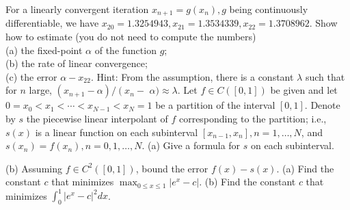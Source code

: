 \documentclass[14pt]{extarticle}
\begin{document}
\newpage
For a linearly convergent iteration $x_{n+1}=g\left(x_{n}\right), g$ being continuously differentiable, we have $x_{20}=1.3254943, x_{21}=1.3534339, x_{22}=1.3708962$. Show how to estimate (you do not need to compute the numbers)\\
(a) the fixed-point $\alpha$ of the function $g$;\\
(b) the rate of linear convergence;\\
(c) the error $\alpha-x_{22}$.
Hint: From the assumption, there is a constant $\lambda$ such that for $n$ large, $\left(x_{n+1}-\alpha\right) /\left(x_{n}-\right.$ $\alpha) \approx \lambda$.
\newpage
Let $f \in C([0,1])$ be given and let $0=x_{0}<x_{1}<\cdots<x_{N-1}<x_{N}=1$ be a partition of the interval $[0,1]$. Denote by $s$ the piecewise linear interpolant of $f$ corresponding to the partition; i.e., $s(x)$ is a linear function on each subinterval $\left[x_{n-1}, x_{n}\right], n=1, \ldots, N$, and $s\left(x_{n}\right)=f\left(x_{n}\right), n=0,1, \ldots, N$.
(a) Give a formula for $s$ on each subinterval.

(b) Assuming $f \in C^{2}([0,1])$, bound the error $f(x)-s(x)$.
\newpage
(a) Find the constant $c$ that minimizes $\max _{0 \leq x \leq 1}\left|e^{x}-c\right|$.
(b) Find the constant $c$ that minimizes $\int_{0}^{1}\left|e^{x}-c\right|^{2} d x$.
\end{document}
